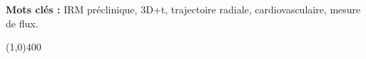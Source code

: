 {%

\noindent
\textbf{Mots clés : } IRM préclinique, 3D+t, trajectoire radiale, cardiovasculaire, mesure de flux.
}

\line(1,0){400} \\

